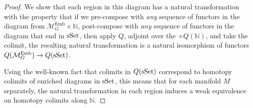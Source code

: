\documentclass[11pt]{amsart}
\theoremstyle{definition}
\numberwithin{equation}{section}
\numberwithin{figure}{section}
\newcommand{\N}{\mathbb N}
\newcommand{\ra}{\longrightarrow}
\newcommand{\mc}{\mathcal}
\newcommand{\Fun}{\textup{Fun}}
\newcommand{\sSet}{\textup{sSet}}
\newcommand{\Man}{\mc M^\mathrm{Emb}}
\begin{document}
\begin{proof}
	We show that each region in this diagram has a natural transformation with the property that if we pre-compose with \emph{any} sequence of functors in the diagram from $\Man_G \times \N$, post-compose with \emph{any} sequence of functors in the diagram that end in $\sSet$, then apply $Q$, adjoint over the $\times Q(\N)$, and take the colimit, the resulting natural transformation is a natural isomorphism of functors $Q(\Man_G) \to Q(\sSet)$.
	
	Using the well-known fact that colimits in $Q(\sSet)$ correspond to homotopy colimits of enriched diagrams in $\sSet$, this means that for each manifold $M$ separately, the natural transformation in each region induces a weak equivalence on homotopy colimits along $\N$.



\end{proof}
\end{document}
